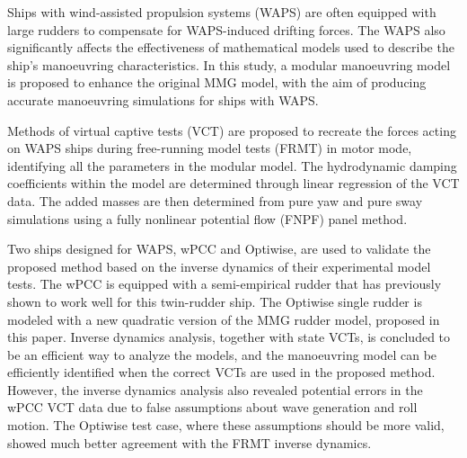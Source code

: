 Ships with wind-assisted propulsion systems (WAPS) are often equipped with large rudders to compensate for WAPS-induced drifting forces. The WAPS also significantly affects the effectiveness of mathematical models used to describe the ship's manoeuvring characteristics. In this study, a modular manoeuvring model is proposed to enhance the original MMG model, with the aim of producing accurate manoeuvring simulations for ships with WAPS.

Methods of virtual captive tests (VCT) are proposed to recreate the forces acting on WAPS ships during free-running model tests (FRMT) in motor mode, identifying all the parameters in the modular model. The hydrodynamic damping coefficients within the model are determined through linear regression of the VCT data. The added masses are then determined from pure yaw and pure sway simulations using a fully nonlinear potential flow (FNPF) panel method.

Two ships designed for WAPS, wPCC and Optiwise, are used to validate the proposed method based on the inverse dynamics of their experimental model tests. The wPCC is equipped with a semi-empirical rudder that has previously shown to work well for this twin-rudder ship. The Optiwise single rudder is modeled with a new quadratic version of the MMG rudder model, proposed in this paper. Inverse dynamics analysis, together with state VCTs, is concluded to be an efficient way to analyze the models, and the manoeuvring model can be efficiently identified when the correct VCTs are used in the proposed method. However, the inverse dynamics analysis also revealed potential errors in the wPCC VCT data due to false assumptions about wave generation and roll motion. The Optiwise test case, where these assumptions should be more valid, showed much better agreement with the FRMT inverse dynamics.


%    

